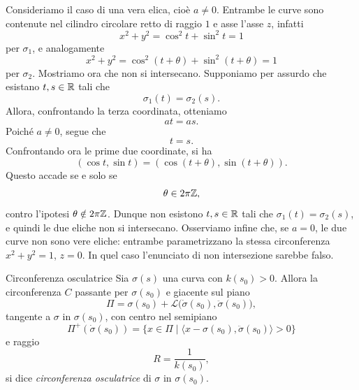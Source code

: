\documentclass[a4paper]{article}
\begin{document}
\begin{snippetsolution}{}
    Consideriamo il caso di una vera elica, cioè \(a\neq 0\). Entrambe le curve sono contenute nel cilindro circolare retto di raggio \(1\) e asse l'asse \(z\), infatti
    \[
        x^2+y^2=\cos^2t+\sin^2t=1
    \]
    per \(\sigma_1\), e analogamente
    \[
        x^2+y^2=\cos^2(t+\theta)+\sin^2(t+\theta)=1
    \]
    per \(\sigma_2\).
    Mostriamo ora che non si intersecano. Supponiamo per assurdo che esistano \(t,s\in\mathbb{R}\) tali che
    \[
        \sigma_1(t)=\sigma_2(s).
    \]
    Allora, confrontando la terza coordinata, otteniamo
    \[
        at=as.
    \]
    Poiché \(a\neq0\), segue che
    \[
        t=s.
    \]
    Confrontando ora le prime due coordinate, si ha
    \[
        (\cos t,\sin t)=(\cos(t+\theta),\sin(t+\theta)).
    \]
    Questo accade se e solo se
    \[
        \theta\in 2\pi\mathbb{Z},
    \]
    contro l'ipotesi \(\theta\notin2\pi\mathbb{Z}\). Dunque non esistono \(t,s\in\mathbb{R}\) tali che \(\sigma_1(t)=\sigma_2(s)\), e quindi le due eliche non si intersecano.
    Osserviamo infine che, se \(a=0\), le due curve non sono vere eliche: entrambe parametrizzano la stessa circonferenza \(x^2+y^2=1\), \(z=0\). In quel caso l'enunciato di non intersezione sarebbe falso.
\end{snippetsolution}

\begin{snippetdefinition}{Circonferenza osculatrice}
Sia \(\sigma(s)\) una curva con \(k(s_0)>0\). Allora la circonferenza \(C\) passante per \(\sigma(s_0)\) e giacente sul piano
\[
     \Pi = \sigma(s_0)+\mathcal L\bigl(\dot\sigma(s_0),\ddot\sigma(s_0)\bigr),
\]
tangente a \(\sigma\) in \(\sigma(s_0)\), con centro nel semipiano
    \[
     \Pi^+(\dot\sigma(s_0))=\bigl\{x\in\Pi \mid \langle x-\sigma(s_0),\ddot\sigma(s_0)\rangle>0\bigr\}
\]
e raggio
\[
     R=\frac{1}{k(s_0)},
\]
si dice \emph{circonferenza osculatrice} di \(\sigma\) in \(\sigma(s_0)\).
\end{snippetdefinition}
\end{document}
